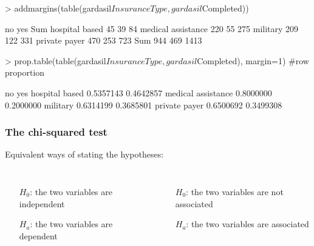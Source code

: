 \begin{frame}[fragile]
\begin{lcverbatim}
> addmargins(table(gardasil$InsuranceType,gardasil$Completed))

                       no  yes  Sum
  hospital based       45   39   84
  medical assistance  220   55  275
  military            209  122  331
  private payer       470  253  723
  Sum                 944  469 1413

> prop.table(table(gardasil$InsuranceType,gardasil$Completed),
        margin=1) #row proportion

                            no       yes
  hospital based     0.5357143 0.4642857
  medical assistance 0.8000000 0.2000000
  military           0.6314199 0.3685801
  private payer      0.6500692 0.3499308
\end{lcverbatim}
\end{frame}

\begin{frame}
\frametitle{The chi-squared test}
\begin{center}
Equivalent ways of stating the hypotheses:
\end{center}
\begin{columns}
\begin{itemize}
    \item[$H_0$:]
     the two variables are independent
    \item[$H_a$:]
     the two variables are dependent
\end{itemize}
\begin{itemize}
    \item[$H_0$:]
     the two variables are not associated
    \item[$H_a$:]
     the two variables are associated
\end{itemize}
\end{columns}
\end{frame}



